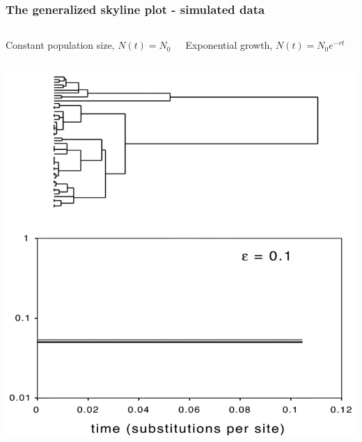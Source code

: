 \begin{frame}
\frametitle{The generalized skyline plot - simulated data}

\begin{columns}[t]

Constant population size, $N(t)=N_0$

Exponential growth, $N(t) = N_0 e^{-rt}$

\end{columns}

\medskip

\begin{columns}[b]


\includegraphics[scale=0.2]{../common/images/genSkylineConstant}



\end{columns}
\end{frame}
